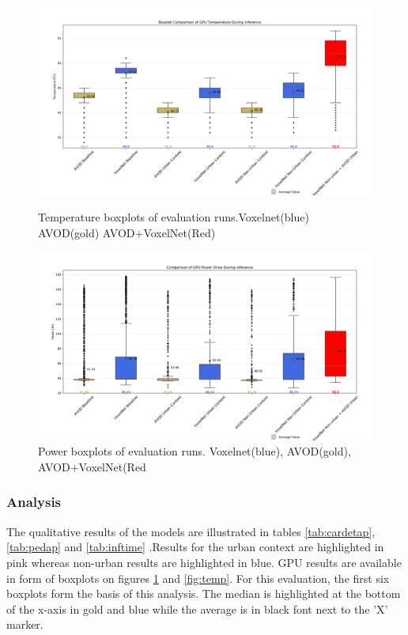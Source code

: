 \begin{figure}[H] %
	\centering
	\begin{minipage}[b]{\textwidth}
		\centering
		\includegraphics[width=\textwidth]{images/gputepbox.png}
		\caption{Temperature boxplots of evaluation runs.Voxelnet(blue) AVOD(gold) AVOD+VoxelNet(Red)}
		\label{fig:temp}
	\end{minipage}
	\begin{minipage}[b]{\textwidth}
		\centering
		\includegraphics[width=\textwidth]{images/gpupbox.png}
		\caption{Power boxplots of evaluation runs. Voxelnet(blue), AVOD(gold), AVOD+VoxelNet(Red}
		\label{fig:power}
	\end{minipage}
	
\end{figure}


\subsubsection*{Analysis}
The qualitative results of the models are illustrated in tables \ref{tab:cardetap}, \ref{tab:pedap} and \ref{tab:inftime} .Results for the urban context are highlighted in pink whereas non-urban results are highlighted in blue. GPU results are available in form of boxplots on figures \ref{fig:power} and \ref{fig:temp}. For this evaluation, the first six boxplots form the basis of this analysis. The median is highlighted at the bottom of the x-axis in gold and blue while the average is in black font next to the 'X' marker.



